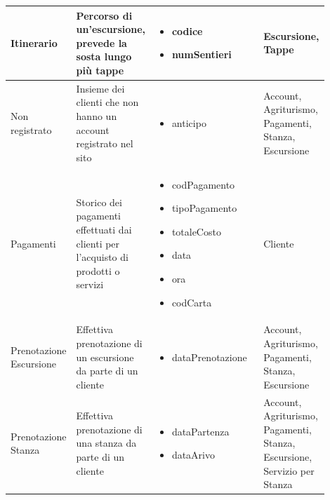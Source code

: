 \documentclass[12pt,a4paper]{article}
\begin{document}
\begin{center}
\begin{longtable}{|p{0.14\linewidth}|p{0.20\linewidth}|p{0.36\linewidth}|p{0.20\linewidth}|}
\hline
Itinerario				 	&  Percorso di un'escursione, prevede la sosta lungo più tappe 
					& \begin{itemize}
						\setlength{\itemindent}{-1em}
						\vspace{-25pt}
						\setlength\itemsep{-0.25em}
						\item codice
						\item numSentieri
					\end{itemize}
					&  Escursione, Tappe  \\ 

\hline
Non registrato				 	&  Insieme dei clienti che non hanno un account registrato nel sito 
					& \begin{itemize}
						\setlength{\itemindent}{-1em}
						\vspace{-25pt}
						\setlength\itemsep{-0.25em}
						\item anticipo
					\end{itemize}
					&  Account, Agriturismo, Pagamenti, Stanza, Escursione  \\ 

\hline
Pagamenti				 	&  Storico dei pagamenti effettuati dai clienti per l'acquisto di prodotti o servizi 
					& \begin{itemize}
						\setlength{\itemindent}{-1em}
						\vspace{-25pt}
						\setlength\itemsep{-0.25em}
						\item codPagamento
						\item tipoPagamento
						\item totaleCosto
						\item data
						\item ora
						\item codCarta
					\end{itemize}
					&  Cliente  \\ 

\hline
Pre\-no\-ta\-zio\-ne Escursione				 	&  Effettiva prenotazione di un escursione da parte di un cliente 
					& \begin{itemize}
						\setlength{\itemindent}{-1em}
						\vspace{-25pt}
						\setlength\itemsep{-0.25em}
						\item dataPrenotazione
					\end{itemize}
					&  Account, Agriturismo, Pagamenti, Stanza, Escursione  \\ 

\hline
Pre\-no\-ta\-zio\-ne Stanza				 	&  Effettiva prenotazione di una stanza da parte di un cliente 
					& \begin{itemize}
						\setlength{\itemindent}{-1em}
						\vspace{-25pt}
						\setlength\itemsep{-0.25em}
						\item dataPartenza
						\item dataArivo
					\end{itemize}
					&  Account, Agriturismo, Pagamenti, Stanza, Escursione, Servizio per Stanza  \\ 


\end{longtable}
\end{center}
\end{document}
